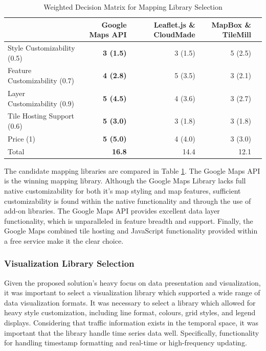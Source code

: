 \documentclass{report}
\begin{document}
\begin{table}
\centering
    \begin{tabular}{l |r r r l}
    ~                             & \textbf{Google Maps API} & Leaflet.js \& CloudMade & MapBox \& TileMill \\ \hline
    Style Customizability  (0.5)  & \textbf{3 (1.5)}         & 3 (1.5)                 & 5 (2.5)            \\
    Feature Customizability (0.7) & \textbf{4 (2.8)}         & 5 (3.5)                 & 3 (2.1)            \\
    Layer Customizability (0.9)   & \textbf{5 (4.5)}         & 4 (3.6)                 & 3 (2.7)            \\
    Tile Hosting Support (0.6)    & \textbf{5 (3.0)}           & 3 (1.8)                 & 3 (1.8)            \\
    Price (1)                     & \textbf{5 (5.0)}           & 4 (4.0)                   & 3 (3.0)              \\ \hline
    Total                         & \textbf{16.8}            & 14.4                    & 12.1               \\
    \end{tabular}
\caption{Weighted Decision Matrix for Mapping Library Selection}
\label{table:mapping-matrix}
\end{table}

The candidate mapping libraries are compared in Table \ref{table:mapping-matrix}. The Google Maps API is the winning mapping library. Although the Google Maps Library lacks full native customizability for both it's map styling and map features, sufficient customizability is found within the native functionality and through the use of add-on libraries. The Google Maps API provides excellent data layer functionality, which is unparalleled in feature breadth and support. Finally, the Google Maps combined tile hosting and JavaScript functionality provided within a free service make it the clear choice.

\subsubsection{Visualization Library Selection}

Given the proposed solution's heavy focus on data presentation and visualization, it was important to select a visualization library which supported a wide range of data visualization formats. It was necessary to select a library which allowed for heavy style customization, including line format, colours, grid styles, and legend displays. Considering that traffic information exists in the temporal space, it was important that the library handle time series data well. Specifically, functionality for handling timestamp formatting and real-time or high-frequency updating.
\end{document}
